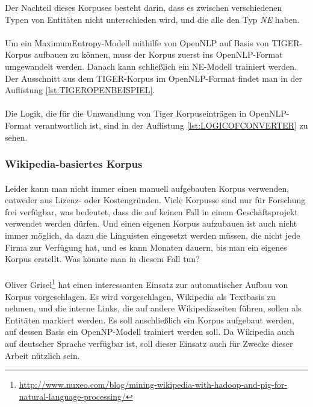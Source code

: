 Der Nachteil dieses Korpuses besteht darin, dass es zwischen verschiedenen Typen von Entitäten nicht unterschieden wird, und die alle den Typ \textit{NE} haben.

\paragraph{}
Um ein MaximumEntropy-Modell mithilfe von OpenNLP auf Basis von TIGER-Korpus aufbauen zu können, muss der Korpus zuerst ins OpenNLP-Format umgewandelt werden. Danach kann schließlich ein NE-Modell trainiert werden. Der Ausschnitt aus dem TIGER-Korpus im OpenNLP-Format findet man in der Auflistung \ref{lst:TIGEROPENBEISPIEL}.



\paragraph{}
Die Logik, die für die Umwandlung von Tiger Korpuseinträgen in OpenNLP-Format verantwortlich ist, sind in der Auflistung \ref{lst:LOGICOFCONVERTER} zu sehen.


\subsubsection{Wikipedia-basiertes Korpus}
\paragraph{}
Leider kann man nicht immer einen manuell aufgebauten Korpus verwenden, entweder aus Lizenz- oder Kostengründen. Viele Korpusse sind nur für Forschung frei verfügbar, was bedeutet, dass 
die auf keinen Fall in einem Geschäftsprojekt verwendet werden dürfen. Und einen eigenen Korpus aufzubauen ist auch nicht immer möglich, da dazu die Linguisten eingesetzt werden müssen, die nicht jede Firma zur Verfügung hat, und es kann Monaten dauern, bis man ein eigenes Korpus erstellt. Was könnte man in diesem Fall tun?

\paragraph{}
Oliver Grisel\footnote{\url{http://www.nuxeo.com/blog/mining-wikipedia-with-hadoop-and-pig-for-natural-language-processing/}} hat einen interessanten Einsatz zur automatischer Aufbau von Korpus vorgeschlagen. Es wird vorgeschlagen, Wikipedia als Textbasis zu nehmen, und die interne Links, die auf andere Wikipediaseiten führen, sollen als  Entitäten markiert werden. Es soll anschließlich ein Korpus aufgebaut werden, auf dessen Basis ein OpenNP-Modell trainiert werden soll. Da Wikipedia auch auf deutscher Sprache verfügbar ist, soll dieser Einsatz auch für Zwecke dieser Arbeit nützlich sein.

